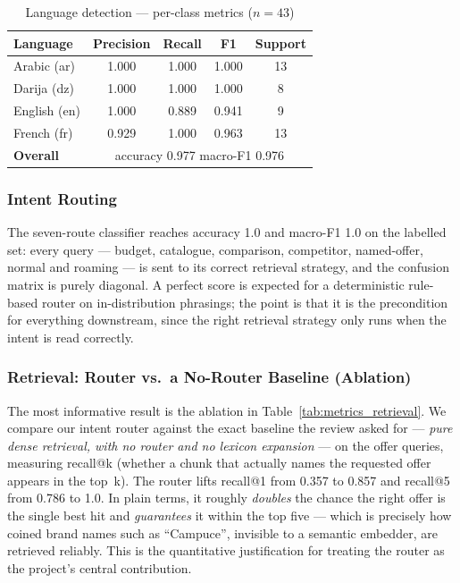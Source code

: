 \documentclass[12pt, a4paper]{report}
\newcommand{\humantext}[1]{#1}      %
\begin{document}
\begin{table}[H]
\centering
\caption{Language detection --- per-class metrics ($n=43$)}
\label{tab:metrics_lang}
\begin{tabularx}{\textwidth}{l c c c c}
\toprule
\textbf{Language} & \textbf{Precision} & \textbf{Recall} & \textbf{F1} & \textbf{Support} \\
\midrule
Arabic (ar)  & 1.000 & 1.000 & 1.000 & 13 \\
Darija (dz)  & 1.000 & 1.000 & 1.000 & 8 \\
English (en) & 1.000 & 0.889 & 0.941 & 9 \\
French (fr)  & 0.929 & 1.000 & 0.963 & 13 \\
\midrule
\textbf{Overall} & \multicolumn{4}{c}{accuracy 0.977 \qquad macro-F1 0.976} \\
\bottomrule
\end{tabularx}
\end{table}

\subsubsection{Intent Routing}
\humantext{The seven-route classifier reaches accuracy 1.0 and macro-F1 1.0 on the labelled set: every query --- budget, catalogue, comparison, competitor, named-offer, normal and roaming --- is sent to its correct retrieval strategy, and the confusion matrix is purely diagonal. A perfect score is expected for a deterministic rule-based router on in-distribution phrasings; the point is that it is the precondition for everything downstream, since the right retrieval strategy only runs when the intent is read correctly.}

\subsubsection{Retrieval: Router vs.\ a No-Router Baseline (Ablation)}
\humantext{The most informative result is the ablation in Table~\ref{tab:metrics_retrieval}. We compare our intent router against the exact baseline the review asked for --- \emph{pure dense retrieval, with no router and no lexicon expansion} --- on the offer queries, measuring recall@k (whether a chunk that actually names the requested offer appears in the top~k). The router lifts recall@1 from 0.357 to 0.857 and recall@5 from 0.786 to 1.0. In plain terms, it roughly \emph{doubles} the chance the right offer is the single best hit and \emph{guarantees} it within the top five --- which is precisely how coined brand names such as ``Campuce'', invisible to a semantic embedder, are retrieved reliably. This is the quantitative justification for treating the router as the project's central contribution.}
\end{document}
